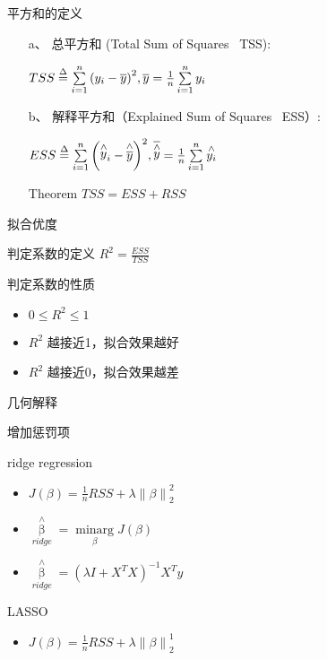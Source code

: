 \documentclass[xetex,mathserif,serif]{beamer}
\begin{document}
\begin{frame}{平方和的定义}
\begin{itemize}
  \item[a、]总平方和 (Total Sum of Squares \ TSS):
  \begin{center}
    $TSS \buildrel \Delta \over = {\sum\limits_{i = 1}^n {\left( {{y_i} - \overline y } \right)} ^2},\overline y  = \frac{1}{n}\sum\limits_{i = 1}^n {{y_i}} $
  \end{center}
  \item[b、]解释平方和（Explained Sum of Squares \ ESS）:
  \begin{center}
    $ESS \buildrel \Delta \over = {\sum\limits_{i = 1}^n {\left( {{{\mathop y\limits^ \wedge  }_i} - \mathop {\overline y }\limits^ \wedge  } \right)} ^2},\overline {\mathop y\limits^ \wedge  }  = \frac{1}{n}\sum\limits_{i = 1}^n {\mathop {{y_i}}\limits^ \wedge  } $
  \end{center}
  \item[Theorem] $TSS = ESS + RSS$
\end{itemize}
\end{frame}

\begin{frame}{拟合优度}
\begin{block}{判定系数的定义}
${R^2} = \frac{{ESS}}{{TSS}}$
\end{block}

\begin{block}{判定系数的性质}
\begin{itemize}
  \item $0 \leq R^2 \leq 1$
  \item $R^2$ 越接近1，拟合效果越好
  \item $R^2$ 越接近0，拟合效果越差
\end{itemize}
\end{block}
\end{frame}

\begin{frame}{几何解释}

\end{frame}

\begin{frame}{增加惩罚项}
\begin{block}{ridge regression}
\begin{itemize}
  \item $J\left( \beta  \right) = \frac{1}{n}RSS + \lambda \left\| \beta  \right\|_2^2$
  \item ${\mathop \beta \limits^ \wedge  _{ridge}} = \mathop {\min \arg }\limits_\beta  J\left( \beta  \right)$
  \item ${\mathop \beta \limits^ \wedge  _{ridge}} = {\left( {\lambda I + {X^T}X} \right)^{ - 1}}{X^T}y$
\end{itemize}
\end{block}

\begin{block}{LASSO}
\begin{itemize}
  \item $J\left( \beta  \right) = \frac{1}{n}RSS + \lambda \left\| \beta  \right\|_2^1$
\end{itemize}
\end{block}
\end{frame}
\end{document}
